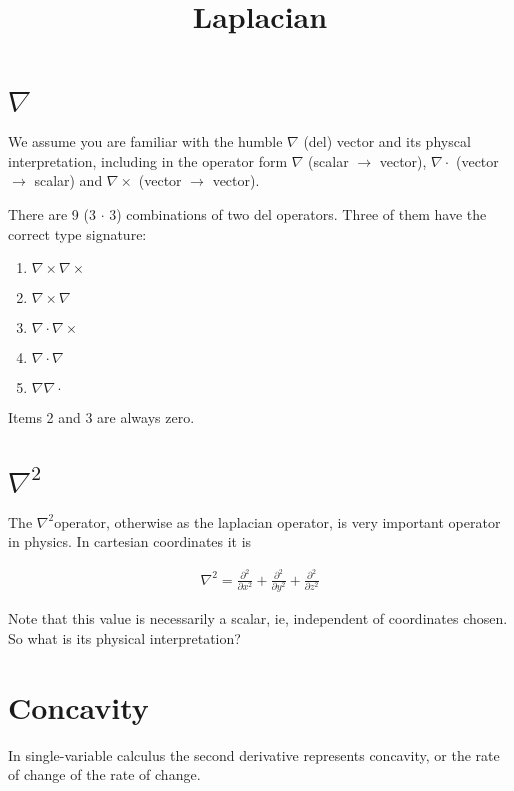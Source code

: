 \documentclass{article}
\title{Laplacian}
\date{}
\begin{document}
\maketitle

\section{$\nabla$}

\newcommand{\dels}{$\nabla^2$}
\newcommand{\delsm}{\nabla^2}

We assume you are familiar with the humble $\nabla$ (del) vector and its physcal interpretation, including in the operator form $\nabla$ (scalar $\rightarrow$ vector), $\nabla\cdot$ (vector $\rightarrow$ scalar) and $\nabla\times$ (vector $\rightarrow$ vector).

There are 9 (3 $\cdot$ 3) combinations of two del operators. Three of them have the correct type signature:

\begin{enumerate}
\item{$\nabla\times\nabla\times$}
\item{$\nabla\times\nabla$}
\item{$\nabla\cdot\nabla\times$}
\item{$\nabla\cdot\nabla$}
\item{$\nabla\nabla\cdot$}
\end{enumerate}

Items 2 and 3 are always zero.

\section{\dels}

The \dels operator, otherwise as the laplacian operator, is very important operator in physics. In cartesian coordinates it is

\begin{eqnarray*}
\delsm = \frac{\partial^2}{\partial x^2} + \frac{\partial^2}{\partial y^2} + \frac{\partial^2}{\partial z^2}
\end{eqnarray*}

Note that this value is necessarily a scalar, ie, independent of coordinates chosen. So what is its physical interpretation?

\section{Concavity}

In single-variable calculus the second derivative represents concavity, or the rate of change of the rate of change.
\end{document}
